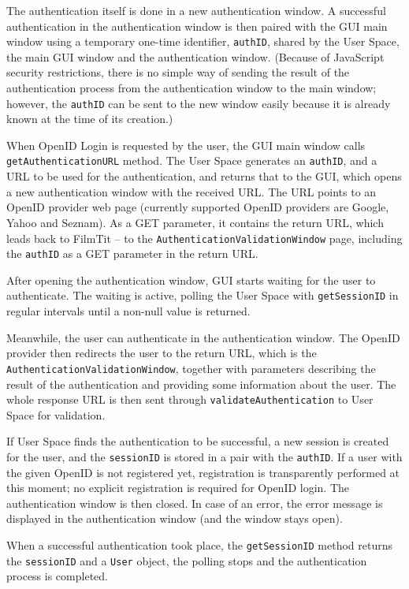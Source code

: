The authentication itself is done in a new authentication window.
A successful authentication in the authentication window is then paired with the GUI main window using a temporary one-time identifier, {\tt authID}, shared by the User Space, the main GUI window and the authentication window.
(Because of JavaScript security restrictions, there is no simple way of sending the result of the authentication process from the authentication window to the main window;
however, the {\tt authID} can be sent to the new window easily because it is already known at the time of its creation.)

When OpenID Login is requested by the user, the GUI main window calls {\tt getAuthenticationURL} method.
The User Space generates an {\tt authID}, and a URL to be used for the authentication, and returns that to the GUI, which opens a new authentication window with the received URL.
The URL points to an OpenID provider web page (currently supported OpenID providers are Google, Yahoo and Seznam). As a GET parameter, it contains the return URL, which leads back to FilmTit -- to the {\tt AuthenticationValidationWindow} page, including the {\tt authID} as a GET parameter in the return URL.

After opening the authentication window, GUI starts waiting for the user to authenticate. The waiting is active, polling the User Space with {\tt getSessionID} in regular intervals until a non-null value is returned.

Meanwhile, the user can authenticate in the authentication window. The OpenID provider then redirects the user to the return URL, which is the {\tt AuthenticationValidationWindow}, together with parameters describing the result of the authentication and providing some information about the user.
The whole response URL is then sent through {\tt validateAuthentication} to User Space for validation.

If User Space finds the authentication to be successful, a new session is created for the user, and the {\tt sessionID} is stored in a pair with the {\tt authID}.
If a user with the given OpenID is not registered yet, registration is transparently performed at this moment; no explicit registration is required for OpenID login.
The authentication window is then closed.
In case of an error, the error message is displayed in the authentication window (and the window stays open).

When a successful authentication took place, the {\tt getSessionID} method returns the {\tt sessionID} and a {\tt User} object, the polling stops and the authentication process is completed.

